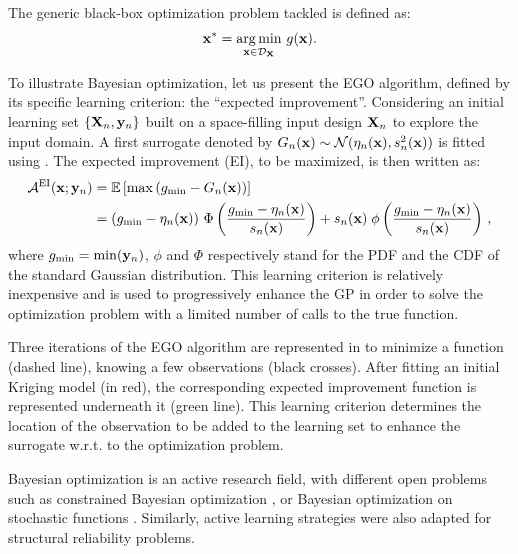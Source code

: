 The generic black-box optimization problem tackled is defined as:
\begin{equation}
    \bx^* = \argmin_{\bx \in \iD_{\bX}} \, g(\bx). %
\end{equation}

To illustrate Bayesian optimization, let us present the EGO algorithm, defined by its specific learning criterion: the ``expected improvement''. 
Considering an initial learning set $\left\{{\bf X}_n, {\bf y}_n\right\}$ built on a space-filling input design ${\bf X}_n$ to explore the input domain. 
A first surrogate denoted by $G_n({\bf x}) \sim \mathcal{N}(\eta_n({\bf x}), s_n^2({\bf x}))$ is fitted using . 
The expected improvement (EI), to be maximized, is then written as: 
\begin{align}
    \mathcal{A}^{\textrm{EI}}({\bf x}; {\bf y}_n) &= \mathbb{E}\left[\max\left(g_{\min} - G_n({\bf x})\right)\right] \\ 
                                  &=\left(g_{\min} - \eta_n({\bf x})\right)\, \Phi\left( \frac{g_{\min} - \eta_n({\bf x})}{s_n({\bf x})}\right) + 
                                    s_n({\bf x}) \; \phi\left(\frac{g_{\min} - \eta_n({\bf x})}{s_n({\bf x})}\right) \,,
    \label{eq:exp_improvement}
\end{align}
where $g_{\min} = \min({\bf y}_n)$, $\phi$ and $\Phi$ respectively stand for the PDF and the CDF of the standard Gaussian distribution.
This learning criterion is relatively inexpensive and is used to progressively enhance the GP in order to solve the optimization problem with a limited number of calls to the true function. 

Three iterations of the EGO algorithm are represented in  to minimize a function (dashed line), knowing a few observations (black crosses). 
After fitting an initial Kriging model (in red), the corresponding expected improvement function is represented underneath it (green line).  
This learning criterion determines the location of the observation to be added to the learning set to enhance the surrogate w.r.t. to the optimization problem. 

Bayesian optimization is an active research field, with different open problems such as constrained Bayesian optimization \citep{petit_2022}, or Bayesian optimization on stochastic functions \citep{gramacy_2020_book}. 
Similarly, active learning strategies were also adapted for structural reliability problems. 

